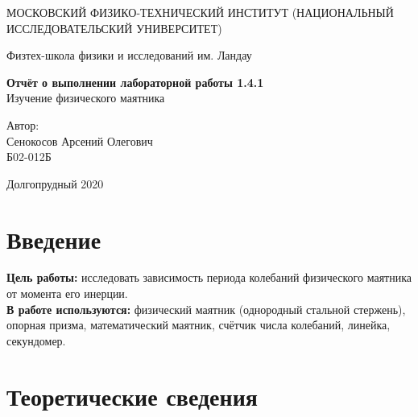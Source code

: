 \documentclass[a4paper,12pt]{article} %
\date{\today}
\begin{document}
\begin{titlepage}
	\begin{center}
		{\large МОСКОВСКИЙ ФИЗИКО-ТЕХНИЧЕСКИЙ ИНСТИТУТ (НАЦИОНАЛЬНЫЙ ИССЛЕДОВАТЕЛЬСКИЙ УНИВЕРСИТЕТ)}
	\end{center}
	\begin{center}
		{\large Физтех-школа физики и исследований им. Ландау}
	\end{center}
	
	
	\vspace{4.5cm}
	{\huge
		\begin{center}
			{\bf Отчёт о выполнении лабораторной работы 1.4.1}\\
			Изучение физического маятника
		\end{center}
	}
	\vspace{2cm}
	\begin{flushright}
		{\LARGE Автор:\\ Сенокосов Арсений Олегович \\
			\vspace{0.2cm}
			Б02-012Б}
	\end{flushright}
	\vspace{8cm}
	\begin{center}
		Долгопрудный 2020
	\end{center}
\end{titlepage}

\section{Введение}

\textbf{Цель работы:} исследовать зависимость периода колебаний физического маятника от момента его инерции.\\
\textbf{В работе используются:} физический маятник (однородный стальной стержень), опорная призма, математический маятник, счётчик числа колебаний, линейка, секундомер.

\section{Теоретические сведения}
\end{document}
